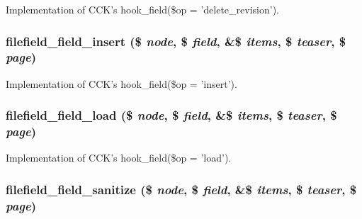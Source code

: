 Implementation of CCK's hook\_\-field(\$op = 'delete\_\-revision'). \hypertarget{filefield__field_8inc_3f9f2f89477b183d503f9eb59c0551c5}{
\subsubsection[{filefield\_\-field\_\-insert}]{\setlength{\rightskip}{0pt plus 5cm}filefield\_\-field\_\-insert (\$ {\em node}, \/  \$ {\em field}, \/  \&\$ {\em items}, \/  \$ {\em teaser}, \/  \$ {\em page})}}
\label{filefield__field_8inc_3f9f2f89477b183d503f9eb59c0551c5}


Implementation of CCK's hook\_\-field(\$op = 'insert'). \hypertarget{filefield__field_8inc_429bfccbecd02b27fb1760a160abeb5b}{
\subsubsection[{filefield\_\-field\_\-load}]{\setlength{\rightskip}{0pt plus 5cm}filefield\_\-field\_\-load (\$ {\em node}, \/  \$ {\em field}, \/  \&\$ {\em items}, \/  \$ {\em teaser}, \/  \$ {\em page})}}
\label{filefield__field_8inc_429bfccbecd02b27fb1760a160abeb5b}


Implementation of CCK's hook\_\-field(\$op = 'load'). \hypertarget{filefield__field_8inc_11dd9e9ff671f58111cb7cbc79129819}{
\subsubsection[{filefield\_\-field\_\-sanitize}]{\setlength{\rightskip}{0pt plus 5cm}filefield\_\-field\_\-sanitize (\$ {\em node}, \/  \$ {\em field}, \/  \&\$ {\em items}, \/  \$ {\em teaser}, \/  \$ {\em page})}}
\label{filefield__field_8inc_11dd9e9ff671f58111cb7cbc79129819}


